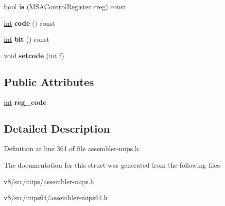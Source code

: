 \begin{DoxyCompactItemize}
\mbox{\label{structv8_1_1internal_1_1MSAControlRegister_a335f6f82f57cf0509223ebff7e91d39b}} 
\mbox{\hyperlink{classbool}{bool}} {\bfseries is} (\mbox{\hyperlink{structv8_1_1internal_1_1MSAControlRegister}{M\+S\+A\+Control\+Register}} creg) const
\item 
\mbox{\label{structv8_1_1internal_1_1MSAControlRegister_a34516d099bfb2cee951f8e2d6454cd55}} 
\mbox{\hyperlink{classint}{int}} {\bfseries code} () const
\item 
\mbox{\label{structv8_1_1internal_1_1MSAControlRegister_acbaf5d74707716b0f043e9634176e4e4}} 
\mbox{\hyperlink{classint}{int}} {\bfseries bit} () const
\item 
\mbox{\label{structv8_1_1internal_1_1MSAControlRegister_a3eb7e8de9042dc9d4389a017a0578efb}} 
void {\bfseries setcode} (\mbox{\hyperlink{classint}{int}} f)
\end{DoxyCompactItemize}
\subsection*{Public Attributes}
\begin{DoxyCompactItemize}
\item 
\mbox{\label{structv8_1_1internal_1_1MSAControlRegister_a0fb7988ffce0a194b8ace236d6e5f3ec}} 
\mbox{\hyperlink{classint}{int}} {\bfseries reg\+\_\+code}
\end{DoxyCompactItemize}


\subsection{Detailed Description}


Definition at line 361 of file assembler-\/mips.\+h.



The documentation for this struct was generated from the following files\+:\begin{DoxyCompactItemize}
\item 
v8/src/mips/assembler-\/mips.\+h\item 
v8/src/mips64/assembler-\/mips64.\+h\end{DoxyCompactItemize}
